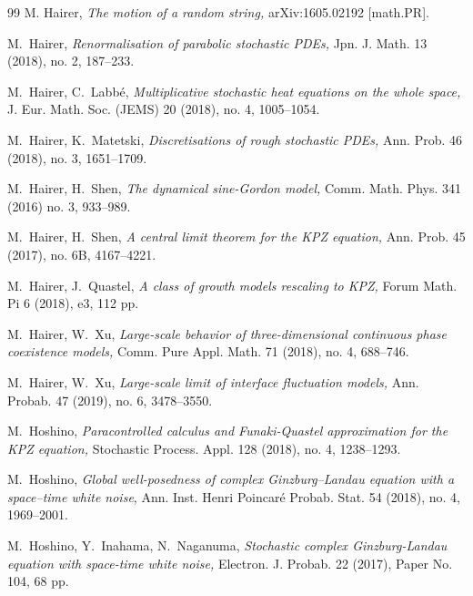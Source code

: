 \documentclass[%
11pt,  reqno]{amsart}
\newcommand{\1}{\hspace{0.2mm}\text{I}\hspace{0.2mm}}
\numberwithin{equation}{section}
\numberwithin{theorem}{section}
\begin{document}
\begin{thebibliography}{99}
M. Hairer,
{\it The motion of a random string,}
arXiv:1605.02192 [math.PR].


M.~Hairer,
{\it Renormalisation of parabolic stochastic {PDE}s,}
 Jpn. J. Math. 13 (2018), no. 2, 187--233.



M.~Hairer, C.~Labb\'{e},
{\it  Multiplicative stochastic heat equations on the whole space,}
J. Eur. Math. Soc. (JEMS) 20 (2018), no. 4, 1005--1054.


M.~Hairer,  K.~Matetski,
{\it Discretisations of rough stochastic {PDEs},}
Ann. Prob. 46 (2018), no. 3, 1651--1709.

M.~Hairer,  H.~Shen,
{\it The dynamical sine-{Gordon} model,}
Comm. Math. Phys. 341 (2016) no. 3, 933--989.




M.~Hairer, H.~Shen,
{\it A central limit theorem for the {KPZ} equation,}
Ann. Prob. 45 (2017), no. 6B, 4167--4221.


M.~Hairer, J.~Quastel,
{\it A class of growth models rescaling to KPZ,}
Forum Math. Pi 6 (2018), e3, 112 pp.

M.~Hairer, W.~Xu,
{\it Large-scale behavior of three-dimensional continuous phase
  coexistence models,}
 Comm. Pure Appl. Math.  71 (2018), no. 4, 688--746.

M.~Hairer, W.~Xu,
{\it Large-scale limit of interface fluctuation models,}
 Ann. Probab. 47 (2019), no. 6, 3478--3550. 



M.~Hoshino, {\it 
Paracontrolled calculus and Funaki-Quastel approximation for the KPZ equation,} Stochastic Process. Appl. 128 (2018), no. 4, 1238--1293. 


M.~Hoshino, {\it 
 Global well-posedness of complex Ginzburg--Landau equation with a space--time white noise}, 
 Ann. Inst. Henri Poincar\'e Probab. Stat. 54 (2018), no. 4, 1969--2001.



M.~Hoshino, Y.~Inahama, N.~Naganuma, {\it 
Stochastic complex Ginzburg-Landau equation with space-time white noise,}
 Electron. J. Probab. 22 (2017), Paper No. 104, 68 pp. 





\end{thebibliography}
\end{document}
